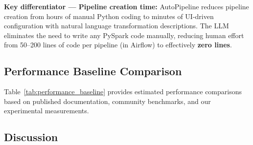 \documentclass[12pt, a4paper]{article}
\begin{document}
\textbf{Key differentiator --- Pipeline creation time:} AutoPipeline reduces pipeline creation from hours of manual Python coding to minutes of UI-driven configuration with natural language transformation descriptions. The LLM eliminates the need to write any PySpark code manually, reducing human effort from 50--200 lines of code per pipeline (in Airflow) to effectively \textbf{zero lines}.


\subsection{Performance Baseline Comparison}

Table~\ref{tab:performance_baseline} provides estimated performance comparisons based on published documentation, community benchmarks, and our experimental measurements.

\begin{table}[H]
\centering
\caption{Performance baseline comparison. AutoPipeline values are measured; others are estimated from documentation.}
\label{tab:performance_baseline}
\renewcommand{\arraystretch}{1.3}
\end{table}

\subsection{Discussion}
\end{document}
